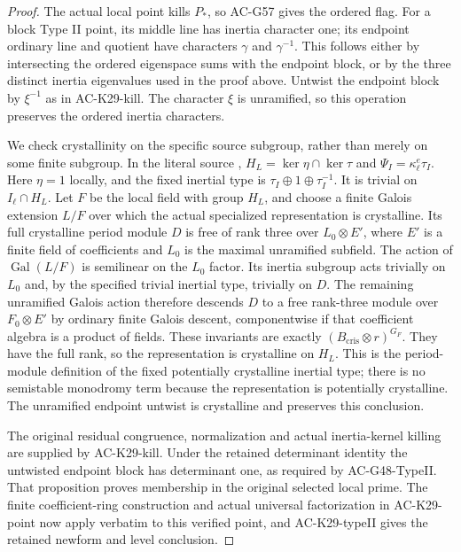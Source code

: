 \begin{proof}
The actual local point kills $P_*$, so AC-G57 gives
the ordered flag.  For a block Type II point, its
middle line has inertia character one; its endpoint
ordinary line and quotient have characters
$\gamma$ and $\gamma^{-1}$.  This follows either
by intersecting the ordered eigenspace sums with
the endpoint block, or by the three distinct
inertia eigenvalues used in the proof above.
Untwist the endpoint block by $\xi^{-1}$ as in
AC-K29-kill.  The character $\xi$ is unramified,
so this operation preserves the ordered inertia
characters.

We check crystallinity on the specific source
subgroup, rather than merely on some finite
subgroup.  In the literal source
,
$H_L=\ker\eta\cap\ker\tau$ and
$\Psi_I=\kappa_\ell^e\tau_I$.
Here $\eta=1$ locally, and the fixed inertial
type is $\tau_I\oplus1\oplus\tau_I^{-1}$.
It is trivial on $I_\ell\cap H_L$.
Let $F$ be the local field with group $H_L$,
and choose a finite Galois extension $L/F$ over
which the actual specialized representation is
crystalline.  Its full crystalline period module
$D$ is free of rank three over $L_0\otimes E'$,
where $E'$ is a finite field of coefficients
and $L_0$ is the maximal unramified subfield.
The action of $\operatorname{Gal}(L/F)$ is
semilinear on the $L_0$ factor.  Its inertia
subgroup acts trivially on $L_0$ and, by the
specified trivial inertial type, trivially on
$D$.  The remaining unramified Galois action
therefore descends $D$ to a free rank-three
module over $F_0\otimes E'$ by ordinary
finite Galois descent, componentwise if that
coefficient algebra is a product of fields.
These invariants are exactly
$(B_{\mathrm{cris}}\otimes r)^{G_F}$.
They have the full rank, so the representation
is crystalline on $H_L$.
This is the period-module definition of the
fixed potentially crystalline inertial type;
there is no semistable monodromy term because
the representation is potentially crystalline.
The unramified endpoint untwist is crystalline
and preserves this conclusion.

The original residual congruence,
normalization and actual inertia-kernel killing
are supplied by AC-K29-kill.  Under the retained
determinant identity the untwisted endpoint block
has determinant one, as required by AC-G48-TypeII.
That proposition proves membership in the original
selected local prime.  The finite coefficient-ring
construction and actual universal factorization
in AC-K29-point now apply verbatim to this verified
point, and AC-K29-typeII gives the retained
newform and level conclusion.
\end{proof}


